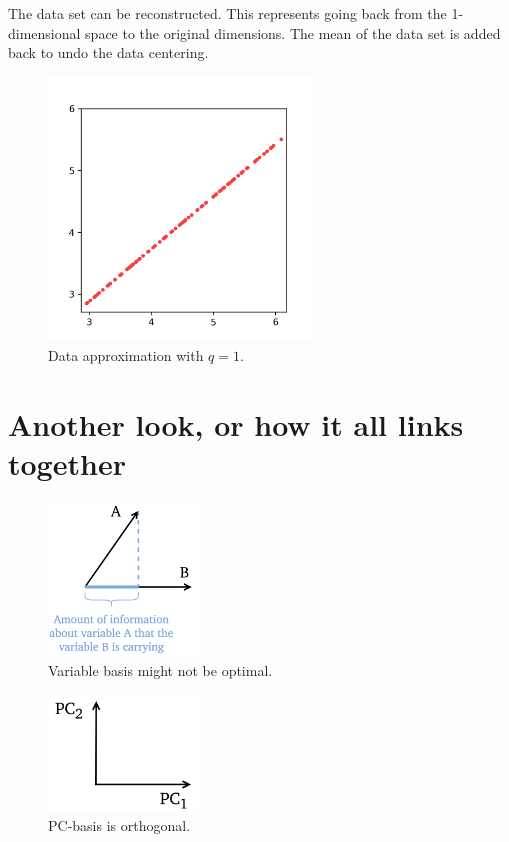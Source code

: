 \documentclass[10pt,twocolumn]{article}
\begin{document}
The data set can be reconstructed. This represents going back from the 1-dimensional space to the original dimensions. The mean of the data set is added back to undo the data centering.

\begin{figure}[H]
\centering\includegraphics[width=7cm]{python-data-approximation.png}
\caption{Data approximation with $q = 1$.}
\label{fig:python-data-approximation}
\end{figure}

\newpage

\section{Another look, or how it all links together}

\begin{figure}[H]
\centering\includegraphics[width=4cm]{variable-basis.png}
\caption{Variable basis might not be optimal.}
\label{fig:variable-basis}
\end{figure}

\begin{figure}[H]
\centering\includegraphics[width=4cm]{PC-basis.png}
\caption{PC-basis is orthogonal.}
\label{fig:PC-basis}
\end{figure}
\end{document}
